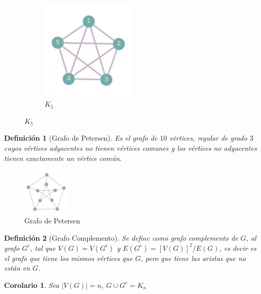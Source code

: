 \documentclass[a4paper,1pt]{report}
\newtheorem*{cor}{Corolario}
\newtheorem*{dfn}{Definición}
\begin{document}
\begin{figure}[H]
\begin{subfigure}[b]{0.22\textwidth}
    \end{subfigure}
    \begin{subfigure}[b]{0.22\textwidth}
        \centering
    \includegraphics[width=0.5\textwidth]{figures2/K5.png}
    \caption{$K_5$}
    \end{subfigure}
\end{figure} 

\begin{dfn}[Grafo de Petersen]
    Es el grafo de $10$ v\'ertices, regular de grado $3$ cuyos vértices adyacentes
    no tienen vértices comunes y los vértices no adyacentes tienen exactamente un vértice común.
\end{dfn}

\begin{figure}[H]
    \centering
    \includegraphics[width=0.2\textwidth]{figures2/Petersen.png}
    \caption{Grafo de Petersen}
\end{figure}

\begin{dfn}[Grafo Complemento]
    Se define como grafo complemento de $G$, al grafo $G^c$, tal que $V(G) = V(G^c)$ y $E(G^c) = [V(G)]^2 / E(G)$, es decir es el grafo que tiene los mismos v\'ertices que $G$, pero que tiene las aristas que no est\'an en $G$.
\end{dfn}

\begin{cor}
  Sea $|V(G)| = n$,  $G \cup G^c = K_n$
\end{cor}
\end{document}

